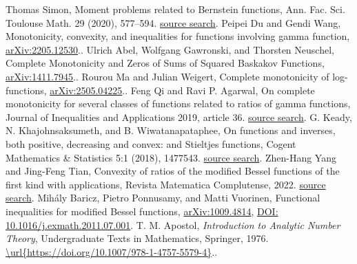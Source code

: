 \begin{thebibliography}{31}
 Thomas Simon, Moment problems related to Bernstein functions, Ann. Fac. Sci. Toulouse Math. 29 (2020), 577--594. \href{https://scholar.google.com/scholar?q=Thomas+Simon%2C+Moment+problems+related+to+Bernstein+functions%2C+Ann.+Fac.+Sci.+Toulouse+Math.+29+%282020%29%2C+577--594.}{source search}.
 Peipei Du and Gendi Wang, Monotonicity, convexity, and inequalities for functions involving gamma function, \href{https://arxiv.org/abs/2205.12530}{arXiv:2205.12530}..
 Ulrich Abel, Wolfgang Gawronski, and Thorsten Neuschel, Complete Monotonicity and Zeros of Sums of Squared Baskakov Functions, \href{https://arxiv.org/abs/1411.7945}{arXiv:1411.7945}..
 Rourou Ma and Julian Weigert, Complete monotonicity of log-functions, \href{https://arxiv.org/abs/2505.04225}{arXiv:2505.04225}..
 Feng Qi and Ravi P. Agarwal, On complete monotonicity for several classes of functions related to ratios of gamma functions, Journal of Inequalities and Applications 2019, article 36. \href{https://scholar.google.com/scholar?q=Feng+Qi+and+Ravi+P.+Agarwal%2C+On+complete+monotonicity+for+several+classes+of+functions+related+to+ratios+of+gamma+functions%2C+Journal+of+Inequalities+and+Applications+2019%2C+article+36.}{source search}.
 G. Keady, N. Khajohnsaksumeth, and B. Wiwatanapataphee, On functions and inverses, both positive, decreasing and convex: and Stieltjes functions, Cogent Mathematics \& Statistics 5:1 (2018), 1477543. \href{https://scholar.google.com/scholar?q=G.+Keady%2C+N.+Khajohnsaksumeth%2C+and+B.+Wiwatanapataphee%2C+On+functions+and+inverses%2C+both+positive%2C+decreasing+and+convex%3A+and+Stieltjes+functions%2C+Cogent+Mathematics+%26+Statistics+5%3A1+%282018%29%2C+1477543.}{source search}.
 Zhen-Hang Yang and Jing-Feng Tian, Convexity of ratios of the modified Bessel functions of the first kind with applications, Revista Matematica Complutense, 2022. \href{https://scholar.google.com/scholar?q=Zhen-Hang+Yang+and+Jing-Feng+Tian%2C+Convexity+of+ratios+of+the+modified+Bessel+functions+of+the+first+kind+with+applications%2C+Revista+Matematica+Complutense%2C+2022.}{source search}.
 Mihály Baricz, Pietro Ponnusamy, and Matti Vuorinen, Functional inequalities for modified Bessel functions, \href{https://arxiv.org/abs/1009.4814}{arXiv:1009.4814}, \href{https://doi.org/10.1016/j.exmath.2011.07.001}{DOI: 10.1016/j.exmath.2011.07.001}.
 T. M. Apostol, \emph{Introduction to Analytic Number Theory}, Undergraduate Texts in Mathematics, Springer, 1976. \url{\url{https://doi.org/10.1007/978-1-4757-5579-4}}..

\end{thebibliography}
